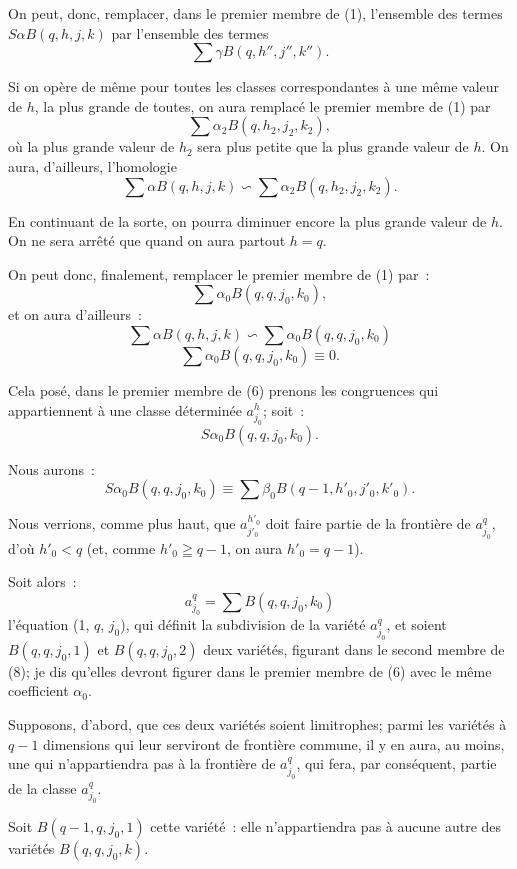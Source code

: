 \documentclass{article}
\begin{document}
On peut, donc, remplacer, dans le premier membre de (1), l'ensemble des termes $S \alpha B(q, h, j, k)$ par l'ensemble des termes
\[ \sum \gamma B(q, h'', j'', k''). \]

Si on opère de même pour toutes les classes correspondantes à une même valeur de $h$, la plus grande de toutes, on aura remplacé le premier membre de (1) par
\[ \sum \alpha_{2} B(q, h_{2}, j_{2}, k_{2}), \]
où la plus grande valeur de $h_{2}$ sera plus petite que la plus grande valeur de $h$. On aura, d'ailleurs, l'homologie
\[ \sum \alpha B(q, h, j, k) \backsim \sum \alpha_{2} B(q, h_{2}, j_{2}, k_{2}). \]

En continuant de la sorte, on pourra diminuer encore la plus grande valeur de $h$. On ne sera arrêté que quand on aura partout $h = q$.

On peut donc, finalement, remplacer le premier membre de (1) par~:
\[ \sum \alpha_{0} B(q, q, j_{0}, k_{0}), \]
et on aura d'ailleurs~:
\[ \sum \alpha B(q, h, j, k) \backsim \sum \alpha_{0} B(q, q, j_{0}, k_{0}) \tag{5} \]
\[ \sum \alpha_{0} B(q, q, j_{0}, k_{0}) \equiv 0. \tag{6} \]

Cela posé, dans le premier membre de (6) prenons les congruences qui appartiennent à une classe déterminée $a^{h}_{j_{0}}$; soit~:
\[ S \alpha_{0} B(q, q, j_{0}, k_{0}). \]

Nous aurons~:
\[ S \alpha_{0} B(q, q, j_{0}, k_{0}) \equiv \sum \beta_{0} B(q - 1, h'_{0}, j'_{0}, k'_{0}). \tag{7} \]

Nous verrions, comme plus haut, que $a^{h'_{0}}_{j'_{0}}$ doit faire partie de la frontière de $a^{q}_{j_{0}}$, d'où $h'_{0} < q$ (et, comme $h'_{0} \geqq q - 1$, on aura $h'_{0} = q - 1$).

Soit alors~:
\[ a^{q}_{j_{0}} = \sum B(q, q, j_{0}, k_{0}) \tag{8} \]
l'équation (1, $q$, $j_{0}$), qui définit la subdivision de la variété $a^{q}_{j_{0}}$, et soient $B(q, q, j_{0}, 1)$ et $B(q, q, j_{0}, 2)$ deux variétés, figurant dans le second membre de (8); je dis qu'elles devront figurer dans le premier membre de (6) avec le même coefficient $\alpha_{0}$.

Supposons, d'abord, que ces deux variétés soient limitrophes; parmi les variétés à $q - 1$ dimensions qui leur serviront de frontière commune, il y en aura, au moins, une qui n'appartiendra pas à la frontière de $a^{q}_{j_{0}}$, qui fera, par conséquent, partie de la classe $a^{q}_{j_{0}}$.

Soit $B(q - 1, q, j_{0}, 1)$ cette variété~: elle n'appartiendra pas à aucune autre des variétés $B(q, q, j_{0}, k)$.
\end{document}
